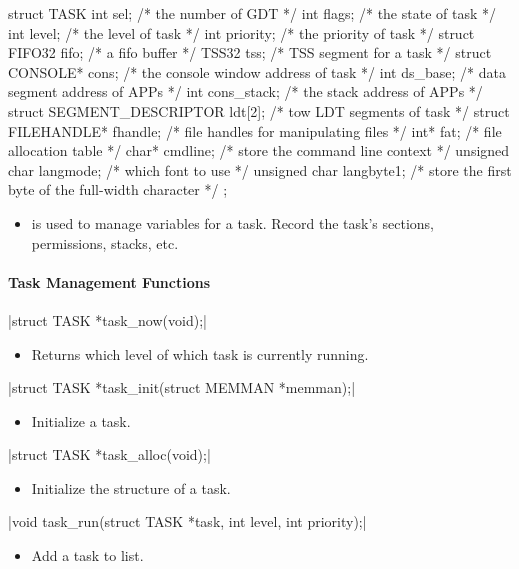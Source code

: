 \documentclass{swfcthesis}
\begin{document}
\begin{codeblock}[1]
\begin{ccode}
struct TASK
{ 
  int sel;              /* the number of GDT */
  int flags;            /* the state of task */
  int level;            /* the level of task */
  int priority;         /* the priority of task */
  struct FIFO32 fifo;   /* a fifo buffer */
  TSS32 tss;            /* TSS segment for a task */
  struct CONSOLE* cons; /* the console window address of task */
  int ds_base;          /* data segment address of APPs */
  int cons_stack;       /* the stack address of APPs */
  struct SEGMENT_DESCRIPTOR ldt[2]; /* tow LDT segments of task */
  struct FILEHANDLE* fhandle; /* file handles for manipulating files */
  int* fat; /* file allocation table */
  char* cmdline; /* store the command line context */
  unsigned char langmode;  /* which font to use */
  unsigned char langbyte1; /* store the first byte of the full-width character */
};
\end{ccode}
\end{codeblock}
\begin{itemize}
\item is used to manage variables for a task. Record the task's sections, permissions,
  stacks, etc.
\end{itemize}

\paragraph{Task Management Functions}

\csingle|struct TASK *task_now(void);|
\begin{itemize}
\item Returns which level of which task is currently running.
\end{itemize}

\csingle|struct TASK *task_init(struct MEMMAN *memman);|
\begin{itemize}
\item Initialize a task.
\end{itemize}

\csingle|struct TASK *task_alloc(void);|
\begin{itemize}
\item Initialize the structure of a task.
\end{itemize}

\csingle|void task_run(struct TASK *task, int level, int priority);|
\begin{itemize}
\item Add a task to list.
\end{itemize}
\end{document}
